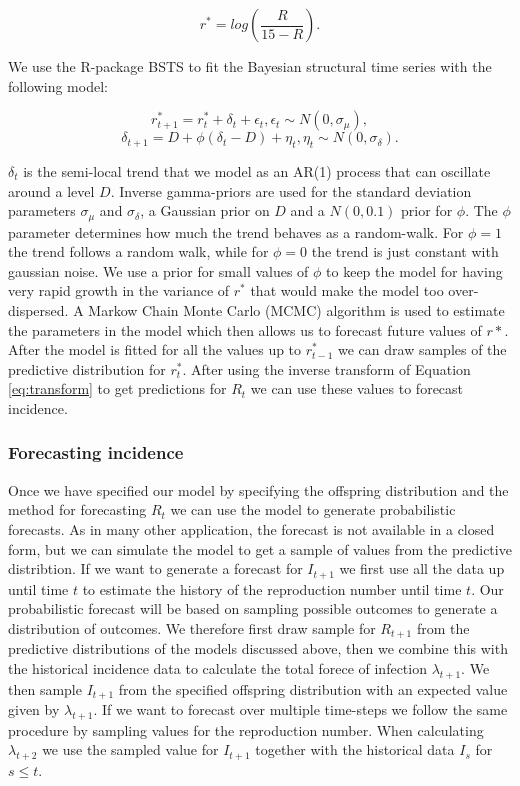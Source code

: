 \documentclass[12pt]{article}
\begin{document}
\begin{equation}
r^* = log\left(\frac{R}{15 - R}\right).
\label{eq:transform}
\end{equation}

We use the R-package BSTS \cite{scottBstsBayesianStructural2019} to fit the Bayesian structural time series with the following model:

\[r^*_{t+1} = r^*_t + \delta_t + \epsilon_t, \epsilon_t \sim N(0, \sigma_\mu),\]
\[\delta_{t+1} = D + \phi(\delta_t - D) + \eta_t, \eta_t \sim N(0, \sigma_\delta).\]

$\delta_t$ is the semi-local trend that we model as an AR(1) process that can oscillate around a level $D$. Inverse gamma-priors are used for the standard deviation parameters $\sigma_\mu$ and $\sigma_\delta$, a Gaussian prior on $D$ and a $N(0, 0.1)$ prior for $\phi$. The $\phi$ parameter determines how much the trend behaves as a random-walk. For $\phi=1$ the trend follows a random walk, while for $\phi=0$ the trend is just constant with gaussian noise. We use a prior for small values of $\phi$ to keep the model for having very rapid growth in the variance of $r^*$ that would make the model too over-dispersed. A Markow Chain Monte Carlo (MCMC) algorithm is used to estimate the parameters in the model which then allows us to forecast future values of $r*$. After the model is fitted for all the values up to  $r^*_{t-1}$ we can draw samples of the predictive distribution for $r^*_t$. After using the inverse transform of Equation \ref{eq:transform} to get predictions for $R_t$ we can use these values to forecast incidence. 


\subsubsection{Forecasting incidence}

Once we have specified our model by specifying the offspring distribution and the method for forecasting $R_t$ we can use the model to generate probabilistic forecasts. As in many other application, the forecast is not available in a closed form, but we can simulate the  model to get a sample of values from the predictive distribtion. If we want to generate a forecast for $I_{t+1}$ we first use all the data up until time $t$ to estimate the history of the reproduction number until time $t$. Our probabilistic forecast will be based on sampling possible outcomes to generate a distribution of outcomes. We therefore first draw sample for $R_{t+1}$ from the predictive distributions of the models discussed above, then we combine this with the historical incidence data to calculate the total forece of infection $\lambda_{t+1}$. We then sample $I_{t+1}$ from the specified offspring distribution with an expected value given by $\lambda_{t+1}$. If we want to forecast over multiple time-steps we follow the same procedure by sampling values for the reproduction number. When calculating $\lambda_{t+2}$ we use the sampled value for $I_{t+1}$ together with the historical data ${I_s}$ for $s\leq t$. 
\end{document}

